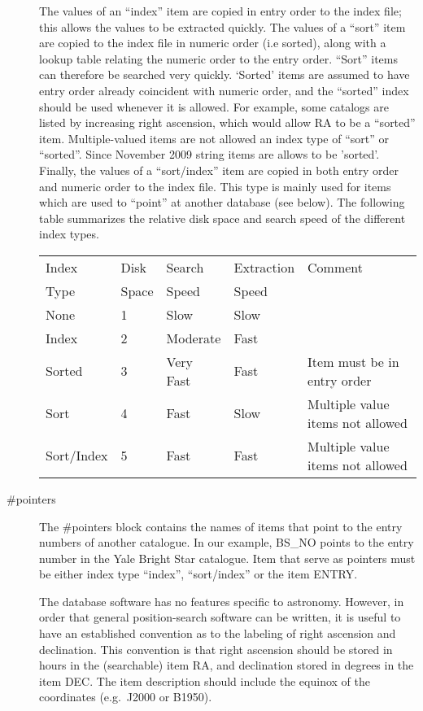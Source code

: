 \begin{description}
The values of an ``index'' item are copied in 
entry order to the index file; this allows the values to be extracted
quickly.   The values of a ``sort'' item are copied to the index file
in numeric order (i.e sorted), along with a lookup table relating 
the numeric order to the entry order.  ``Sort'' items can therefore be
searched very quickly.  `Sorted' items are assumed to have entry order
already coincident with numeric order, and the ``sorted'' index should be
used whenever it is allowed. For example, some catalogs are
listed by increasing right ascension, which would allow RA to be a
``sorted'' item.  Multiple-valued  items are not allowed 
an index type of ``sort'' or
``sorted''.   Since November 2009 string items are allows to be 'sorted'. 
Finally, the values of a ``sort/index'' item are copied in both
entry order and numeric order to the index file.  This type is mainly used
for items which are used to ``point'' at another database (see below).
The following table summarizes the relative disk space and search
speed of the different index types. 
\vspace{0.1in}
\begin{tabular}{|l|l|l|l|l|} \hline
Index  & Disk  & Search & Extraction & Comment \\ 
Type & Space  & Speed & Speed & \\ \hline\hline
None & 1 &  Slow & Slow & \\ \hline
Index & 2 & Moderate & Fast & \\ \hline
Sorted & 3 & Very Fast & Fast & Item must be in entry order \\ \hline 
Sort & 4 & Fast & Slow & Multiple value items not allowed \\   \hline
Sort/Index & 5 & Fast & Fast & Multiple value items not allowed \\ \hline
\end{tabular}
\vspace{0.1in}
\item [\#pointers] The \#pointers block contains the names of items
that point to the entry numbers of another catalogue.  In our example,
BS\_NO points to the entry number in the Yale Bright Star catalogue.
Item that serve as pointers must be either index type ``index'',
``sort/index'' or the item ENTRY.

The database software has no features specific to astronomy.    However,
in order that general position-search software can be written, it is useful
to have an established convention as to the labeling of right ascension and
declination.   This convention is that right ascension should be
stored in hours in the (searchable) item RA, and declination stored in
degrees in the item DEC.     The item description should include the 
equinox of the coordinates (e.g.\ J2000 or B1950).
 
\end{description}

